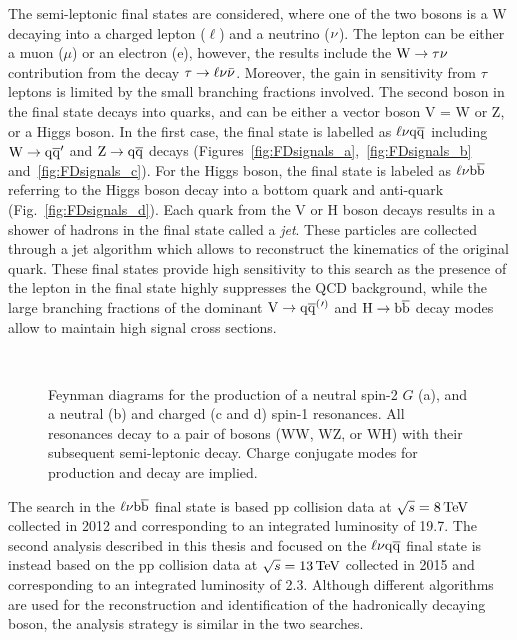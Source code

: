 The semi-leptonic final states are considered, where one of the two bosons is a W decaying into a charged lepton ($\ell$) and a neutrino ($\nu$).
The lepton can be either a muon ($\mu$) or an electron (e), however, the results include the $\mathrm{W}\to\tau\nu$ contribution from the decay $\tau\to\ell\nu\bar{\nu}$.
Moreover, the gain in sensitivity from $\tau$ leptons is limited by the small branching fractions involved.
The second boson in the final state decays into quarks, and can be either a vector boson V = W or Z,
or a Higgs boson. In the first case, the final state is labelled as $\ell\nu\mathrm{q}\overline{\mathrm{q}}$ including $\mathrm{W}\to\mathrm{q}\overline{\mathrm{q}}^\prime$ and $\mathrm{Z}\to\mathrm{q}\overline{\mathrm{q}}$ decays (Figures~\ref{fig:FDsignals_a},~\ref{fig:FDsignals_b} and~\ref{fig:FDsignals_c}).
For the Higgs boson, the final state is labeled as $\ell\nu{\mathrm{b}\overline{\mathrm{b}}}$ referring to the Higgs boson decay into a bottom quark and anti-quark (Fig.~\ref{fig:FDsignals_d}).
Each quark from the V or H boson decays results in a shower of hadrons in the final state called a \textit{jet}. These particles are collected through a jet algorithm which allows to reconstruct the kinematics of the original quark.
These final states provide high sensitivity to this search as the presence of the lepton in the final state highly suppresses the QCD background, while the large branching fractions of the dominant $\mathrm{V}\to\mathrm{q}\overline{\mathrm{q}}^({}'^){}$ and $\mathrm{H}\to{\mathrm{b}\overline{\mathrm{b}}}$ decay modes allow to maintain high signal cross sections.

\begin{figure}[!htb]
\centering
{}\hspace{1cm}
\\
\hspace{1cm}
\caption{Feynman diagrams for the production of a neutral spin-2 $G$ (a), and a neutral \Zpr (b) and charged \Wpr (c and d) spin-1 resonances.
All resonances decay to a pair of bosons (WW, WZ, or WH) with their subsequent semi-leptonic decay. Charge conjugate modes for \Wpr production and decay are implied.}
\label{fig:FDsignals}
\end{figure}

The search in the $\ell\nu{\mathrm{b}\overline{\mathrm{b}}}$ final state is based pp collision data at $\sqrt{s} = 8\,\text{Te\hspace{-.08em}V}$ collected in 2012 and corresponding to an integrated luminosity of 19.7\fbinv.
The second analysis described in this thesis and focused on the $\ell\nu\mathrm{q}\overline{\mathrm{q}}$ final state is instead based on the pp collision data at $\sqrt{s} = 13\,\text{Te\hspace{-.08em}V}$
collected in 2015 and corresponding to an integrated luminosity of 2.3\fbinv.
Although different algorithms are used for the reconstruction and identification of the hadronically decaying boson, the analysis strategy is similar in the two searches.\\


